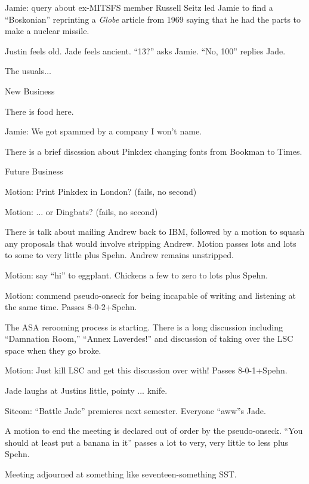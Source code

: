 \documentclass[12pt]{article}
\begin{document}
Jamie: query about ex-MITSFS member Russell Seitz led Jamie to find a
``Boskonian'' reprinting a {\it Globe} article from 1969 saying that he
had the parts to make a nuclear missile.

Justin feels old.  Jade feels ancient.  ``13?'' asks Jamie.  ``No, 100''
replies Jade.

The usuals$\ldots$

\vskip 12pt

\centerline{New Business}

There is food here.

Jamie: We got spammed by a company I won't name.

There is a brief discssion about Pinkdex changing fonts from Bookman
to Times.

\vskip 12pt

\centerline{Future Business}

Motion: Print Pinkdex in London?  (fails, no second)

Motion: ... or Dingbats? (fails, no second)

There is talk about mailing Andrew back to IBM, followed by a motion
to squash any proposals that would involve stripping Andrew.  Motion
passes lots and lots to some to very little plus Spehn.  Andrew remains
unstripped.

Motion: say ``hi'' to eggplant.  Chickens a few to zero to lots plus Spehn.

Motion: commend pseudo-onseck for being incapable of writing and listening
at the same time.  Passes 8-0-2+Spehn.

The ASA rerooming process is starting.  There is a long discussion including
``Damnation Room,'' ``Annex Laverdes!'' and discussion of taking over the LSC
space when they go broke.

Motion: Just kill LSC and get this discussion over with!  Passes 8-0-1+Spehn.

Jade laughs at Justins little, pointy ... knife.

Sitcom: ``Battle Jade'' premieres next semester.  Everyone ``aww''s Jade.

A motion to end the meeting is declared out of order by the pseudo-onseck.
``You should at least put a banana in it'' passes a lot to very, very little
to less plus Spehn.

Meeting adjourned at something like seventeen-something SST.
\end{document}
